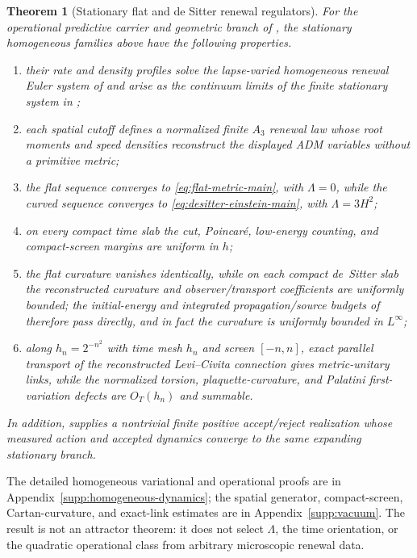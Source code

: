 \documentclass[11pt]{article}
\newtheorem{theorem}{Theorem}[section]
\theoremstyle{definition}
\theoremstyle{remark}
\begin{document}
\begin{theorem}[Stationary flat and de Sitter renewal regulators]
\label{mt:vacuum}
For the operational predictive carrier and geometric branch of
, the stationary homogeneous families above have
the following properties.
\begin{enumerate}[label=\textup{(\roman*)},leftmargin=2.8em]
\item their rate and density profiles solve the lapse-varied homogeneous renewal
      Euler system of  and arise as the
      continuum limits of the finite stationary system in
      ;
\item each spatial cutoff defines a normalized finite $A_3$ renewal law whose
      root moments and speed densities reconstruct the displayed ADM variables
      without a primitive metric;
\item the flat sequence converges to \eqref{eq:flat-metric-main}, with
      $\Lambda=0$, while the curved sequence converges to
      \eqref{eq:desitter-einstein-main}, with $\Lambda=3H^2$;
\item on every compact time slab the cut, Poincar\'e, low-energy counting, and
      compact-screen margins are uniform in $h$;
\item the flat curvature vanishes identically, while on each compact de~Sitter
      slab the reconstructed curvature and observer/transport coefficients are
      uniformly bounded; the initial-energy and integrated propagation/source
      budgets of  therefore pass directly,
      and in fact the curvature is uniformly bounded in $L^\infty$;
\item along $h_n=2^{-n^2}$ with time mesh $h_n$ and screen $[-n,n]$, exact
      parallel transport of the reconstructed Levi--Civita connection gives
      metric-unitary links, while the normalized torsion, plaquette-curvature,
      and Palatini first-variation defects are $O_T(h_n)$ and summable.
\end{enumerate}
In addition,  supplies a nontrivial
finite positive accept/reject realization whose measured action and accepted
dynamics converge to the same expanding stationary branch.
\end{theorem}

The detailed homogeneous variational and operational proofs are in
Appendix~\ref{supp:homogeneous-dynamics}; the spatial generator, compact-screen,
Cartan-curvature, and exact-link estimates are in Appendix~\ref{supp:vacuum}.
The result is not an attractor theorem: it does not select $\Lambda$, the time
orientation, or the quadratic operational class from arbitrary microscopic
renewal data.
\end{document}
